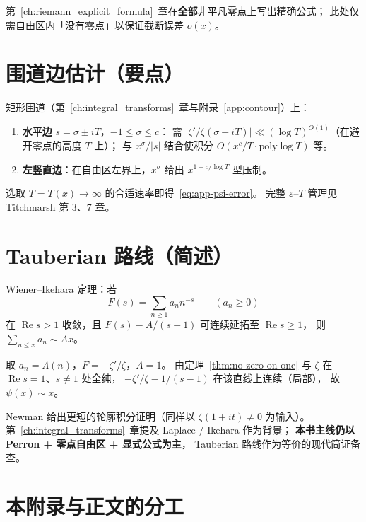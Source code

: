 第~\ref{ch:riemann_explicit_formula}~章在\textbf{全部}非平凡零点上写出精确公式；
此处仅需自由区内「没有零点」以保证截断误差 $o(x)$。

\section{围道边估计（要点）}
\label{sec:app-contour}

矩形围道（第~\ref{ch:integral_transforms}~章与附录~\ref{app:contour}）上：
\begin{enumerate}
  \item \textbf{水平边} $s=\sigma\pm iT$，$-1\le\sigma\le c$：
    需 $|\zeta'/\zeta(\sigma+iT)|\ll (\log T)^{O(1)}$（在避开零点的高度 $T$ 上）；
    与 $x^{\sigma}/|s|$ 结合使积分 $O(x^{c}/T\cdot\mathrm{poly}\log T)$ 等。
  \item \textbf{左竖直边}：在自由区左界上，$x^{\sigma}$ 给出 $x^{1-c/\log T}$ 型压制。
\end{enumerate}
选取 $T=T(x)\to\infty$ 的合适速率即得~\eqref{eq:app-psi-error}。
完整 $\varepsilon$--$T$ 管理见 Titchmarsh 第 3、7 章。

\section{Tauberian 路线（简述）}
\label{sec:app-tauberian}

Wiener--Ikehara 定理：若
\[
  F(s)=\sum_{n\ge 1}a_n n^{-s}
  \qquad (a_n\ge 0)
\]
在 $\operatorname{Re}s>1$ 收敛，且 $F(s)-A/(s-1)$ 可连续延拓至 $\operatorname{Re}s\ge 1$，
则 $\sum_{n\le x}a_n\sim A x$。

取 $a_n=\Lambda(n)$，$F=-\zeta'/\zeta$，$A=1$。
由定理~\ref{thm:no-zero-on-one} 与 $\zeta$ 在 $\operatorname{Re}s=1$、$s\neq 1$ 处全纯，
$-\zeta'/\zeta-1/(s-1)$ 在该直线上连续（局部），
故 $\psi(x)\sim x$。

Newman 给出更短的轮廓积分证明（同样以 $\zeta(1+it)\neq 0$ 为输入）。
第~\ref{ch:integral_transforms}~章提及 Laplace / Ikehara 作为背景；
\textbf{本书主线仍以 Perron + 零点自由区 + 显式公式为主}，
Tauberian 路线作为等价的现代简证备查。

\section*{本附录与正文的分工}

